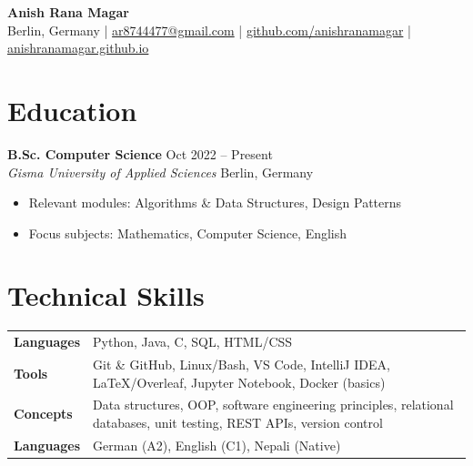 \documentclass[11pt, a4paper]{article}
\newcommand{\cventry}[4]{%
  \textbf{#1} \hfill \textcolor{muted}{\small #2}\\
  \textit{\small #3} \hfill \textcolor{muted}{\small #4}\\
}
\begin{document}
\begin{center}
  {\Huge\bfseries Anish Rana Magar}\\[6pt]
  {\color{muted}\small
    Berlin, Germany \quad|\quad
    \href{mailto:ar8744477@gmail.com}{ar8744477@gmail.com} \quad|\quad
    \href{https://github.com/anishranamagar}{github.com/anishranamagar} \quad|\quad
    \href{https://anishranamagar.github.io}{anishranamagar.github.io}
  }
\end{center}

\vspace{6pt}

\section{Education}

\cventry{B.Sc. Computer Science}{Oct 2022 -- Present}
        {Gisma University of Applied Sciences}{Berlin, Germany}
\begin{itemize}[leftmargin=1.2em, itemsep=1pt, topsep=2pt]
  \item Relevant modules: Algorithms \& Data Structures, Design Patterns
\end{itemize}

\begin{itemize}[leftmargin=1.2em, itemsep=1pt, topsep=2pt]
  \item Focus subjects: Mathematics, Computer Science, English
\end{itemize}

\section{Technical Skills}

\begin{tabularx}{\linewidth}{@{} l X}
  \textbf{Languages}   & Python, Java, C, SQL, HTML/CSS \\[2pt]
  \textbf{Tools}       & Git \& GitHub, Linux/Bash, VS Code, IntelliJ IDEA,
                          \LaTeX{}/Overleaf, Jupyter Notebook, Docker (basics) \\[2pt]
  \textbf{Concepts}    & Data structures, OOP, software engineering principles,
                         relational databases, unit testing, REST APIs, version control \\[2pt]
  \textbf{Languages}   & German (A2), English (C1), Nepali (Native) \\
\end{tabularx}
\end{document}
